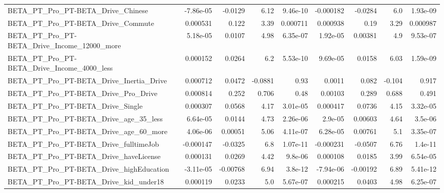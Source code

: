 \begin{tabular}{lrrrrrrrr}
BETA\_PT\_Pro\_PT-BETA\_Drive\_Chinese                  &   -7.86e-05 &      -0.0129 &     6.12 & 9.46e-10 &  -0.000182 &     -0.0284 &          6.0 &      1.93e-09 \\
BETA\_PT\_Pro\_PT-BETA\_Drive\_Commute                  &    0.000531 &        0.122 &     3.39 & 0.000711 &   0.000938 &        0.19 &         3.29 &      0.000987 \\
BETA\_PT\_Pro\_PT-BETA\_Drive\_Income\_12000\_more        &    5.18e-05 &       0.0107 &     4.98 & 6.35e-07 &   1.92e-05 &     0.00381 &          4.9 &      9.53e-07 \\
BETA\_PT\_Pro\_PT-BETA\_Drive\_Income\_4000\_less         &    0.000152 &       0.0264 &      6.2 & 5.53e-10 &   9.69e-05 &      0.0158 &         6.03 &      1.59e-09 \\
BETA\_PT\_Pro\_PT-BETA\_Drive\_Inertia\_Drive            &    0.000712 &       0.0472 &  -0.0881 &     0.93 &     0.0011 &       0.082 &       -0.104 &         0.917 \\
BETA\_PT\_Pro\_PT-BETA\_Drive\_Pro\_Drive                &    0.000814 &        0.252 &    0.706 &     0.48 &    0.00103 &       0.289 &        0.688 &         0.491 \\
BETA\_PT\_Pro\_PT-BETA\_Drive\_Single                   &    0.000307 &       0.0568 &     4.17 & 3.01e-05 &   0.000417 &      0.0736 &         4.15 &      3.32e-05 \\
BETA\_PT\_Pro\_PT-BETA\_Drive\_age\_35\_less              &    6.64e-05 &       0.0144 &     4.73 & 2.26e-06 &    2.9e-05 &     0.00603 &         4.64 &       3.5e-06 \\
BETA\_PT\_Pro\_PT-BETA\_Drive\_age\_60\_more              &    4.06e-06 &      0.00051 &     5.06 & 4.11e-07 &   6.28e-05 &     0.00761 &          5.1 &      3.35e-07 \\
BETA\_PT\_Pro\_PT-BETA\_Drive\_fulltimeJob              &   -0.000147 &      -0.0325 &      6.8 & 1.07e-11 &  -0.000231 &     -0.0507 &         6.76 &       1.4e-11 \\
BETA\_PT\_Pro\_PT-BETA\_Drive\_haveLicense              &    0.000131 &       0.0269 &     4.42 &  9.8e-06 &   0.000108 &      0.0185 &         3.99 &      6.54e-05 \\
BETA\_PT\_Pro\_PT-BETA\_Drive\_highEducation            &   -3.11e-05 &     -0.00768 &     6.94 &  3.8e-12 &  -7.94e-06 &    -0.00192 &         6.89 &      5.41e-12 \\
BETA\_PT\_Pro\_PT-BETA\_Drive\_kid\_under18              &    0.000119 &       0.0233 &      5.0 & 5.67e-07 &   0.000215 &      0.0403 &         4.98 &      6.25e-07 \\

\end{tabular}
